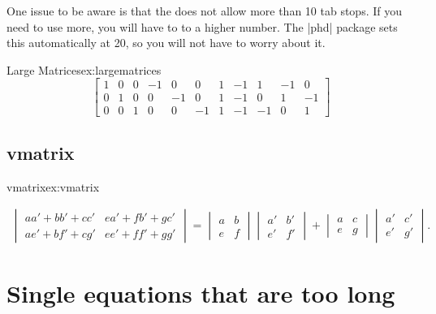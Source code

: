 One issue to be aware is that the  does not allow more than 10 tab stops. If you need to use more, you will have to  to a higher number. The |phd| package sets this automatically at 20, so you will not have to worry about it.

\begin{teX}
\setcounter{MaxMatrixCols}{20}
\end{teX}

\begin{texexample}{Large Matrices}{ex:largematrices}
\[
\begin{bmatrix}
1 & 0 & 0 & -1 & 0  & 0  & 1 & -1 & 1  & -1 & 0 \\
0 & 1 & 0 & 0  & -1 & 0  & 1 & -1 & 0  & 1  & -1 \\
0 & 0 & 1 & 0  & 0  & -1 & 1 & -1 & -1 & 0  & 1 
\end{bmatrix}
\]
\end{texexample}



\subsection{vmatrix}

\begin{texexample}{vmatrix}{ex:vmatrix}

\begin{gather}
\begin{vmatrix}
aa' + bb' + cc' & ea' + fb' + gc' \\
ae' + bf' + cg' & ee' + ff' + gg'
\end{vmatrix}
{} = \begin{vmatrix}
a & b \\
e & f
\end{vmatrix}  \begin{vmatrix}
a' & b' \\
e' & f'
\end{vmatrix} + \begin{vmatrix}
a & c \\
e & g
\end{vmatrix}  \begin{vmatrix}
a' & c' \\
e' & g'
\end{vmatrix}.
\end{gather}
\end{texexample}





\section{Single equations that are too long}

